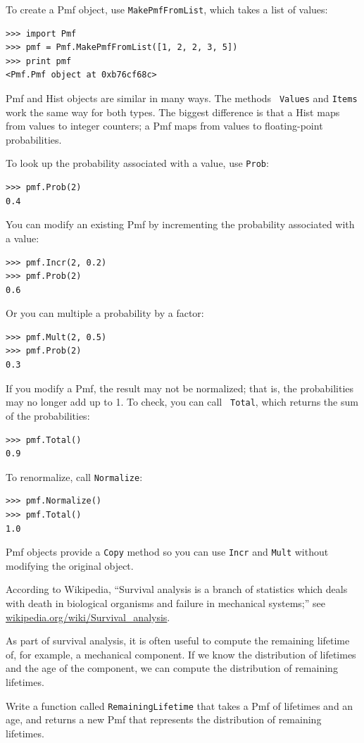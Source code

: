 \documentclass[12pt]{book}
\begin{document}
To create a Pmf object, use {\tt MakePmfFromList}, which takes a list
of values:

\begin{verbatim}
>>> import Pmf
>>> pmf = Pmf.MakePmfFromList([1, 2, 2, 3, 5])
>>> print pmf
<Pmf.Pmf object at 0xb76cf68c>
\end{verbatim}

Pmf and Hist objects are similar in many ways.  The methods {\tt
  Values} and {\tt Items} work the same way for both types.  The
biggest difference is that a Hist maps from values to integer
counters; a Pmf maps from values to floating-point probabilities.

To look up the probability associated with a value, use {\tt Prob}:

\begin{verbatim}
>>> pmf.Prob(2)
0.4
\end{verbatim}

You can modify an existing Pmf by incrementing the probability
associated with a value:

\begin{verbatim}
>>> pmf.Incr(2, 0.2)
>>> pmf.Prob(2)
0.6
\end{verbatim}

Or you can multiple a probability by a factor:

\begin{verbatim}
>>> pmf.Mult(2, 0.5)
>>> pmf.Prob(2)
0.3
\end{verbatim}

If you modify a Pmf, the result may not be normalized; that is, the
probabilities may no longer add up to 1.  To check, you can call {\tt
  Total}, which returns the sum of the probabilities:

\begin{verbatim}
>>> pmf.Total()
0.9
\end{verbatim}

To renormalize, call {\tt Normalize}:

\begin{verbatim}
>>> pmf.Normalize()
>>> pmf.Total()
1.0
\end{verbatim}

Pmf objects provide a {\tt Copy} method so you can
use {\tt Incr} and {\tt Mult} without modifying the original object.

\begin{exercise}
According to Wikipedia, ``Survival analysis is a branch of statistics
which deals with death in biological organisms and failure in
mechanical systems;'' see \url{wikipedia.org/wiki/Survival_analysis}.


As part of survival analysis, it is often useful to compute the
remaining lifetime of, for example, a mechanical component.  If we
know the distribution of lifetimes and the age of the component,
we can compute the distribution of remaining lifetimes.

Write a function called {\tt RemainingLifetime} that takes a
Pmf of lifetimes and an age, and returns a new Pmf that represents
the distribution of remaining lifetimes.

\end{exercise}
\end{document}
